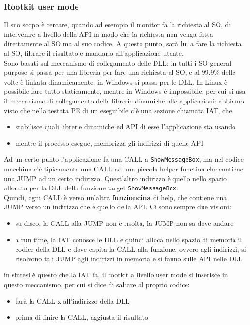 \documentclass[12pt, oneside]{extbook}
\begin{document}
\subsubsection{Rootkit user mode}
Il suo scopo è cercare, quando ad esempio il monitor fa la richiesta al SO, di intervenire a livello della API in modo che la richiesta non venga fatta direttamente al SO ma al suo codice. A questo punto, sarà lui a fare la richiesta al SO, filtrare il risultato e mandarlo all'applicazione utente.\\Sono basati sul meccanismo di collegamento delle DLL: in tutti i SO general purpose si passa per una libreria per fare una richiesta al SO, e al 99.9\% delle volte è linkata dinamicamente, in Windows si passa per le DLL. In Linux è possibile fare tutto staticamente, mentre in Windows è impossibile, per cui si usa il meccanismo di collegamento delle librerie dinamiche alle applicazioni: abbiamo visto che nella testata PE di un eseguibile c'è una sezione chiamata IAT, che
\begin{itemize}
	\item stabilisce quali librerie dinamiche ed API di esse l'applicazione sta usando
	\item mentre il processo esegue, memorizza gli indirizzi di quelle API
\end{itemize}
Ad un certo punto l'applicazione fa una CALL a \texttt{ShowMessageBox}, ma nel codice macchina c'è tipicamente una CALL ad una piccola helper function che contiene una JUMP ad un certo indirizzo. Quest'altro indirizzo è quello nello spazio allocato per la DLL della funzione target \texttt{ShowMessageBox}.\\Quindi, ogni CALL è verso un'altra \textbf{\textsf{funzioncina}} di help, che contiene una JUMP verso un indirizzo che è quello della API. Ci sono sempre due visioni:
\begin{itemize}
	\item su disco, la CALL alla JUMP non è risolta, la JUMP non sa dove andare
	\item a run time, la IAT conosce le DLL e quindi alloca nello spazio di memoria il codice della DLL e dove capita la CALL alla funzione, ovvero agli indirizzi, si risolvono tali JUMP agli indirizzi in memoria e si fanno sulle API nelle DLL
\end{itemize}
in sintesi è questo che la IAT fa, il rootkit a livello user mode si inserisce in questo meccanismo, per cui si dice di saltare al proprio codice:
\begin{itemize}
	\item farà la CALL x all'indirizzo della DLL
	\item prima di finire la CALL, aggiusta il risultato
\end{itemize}
\end{document}
